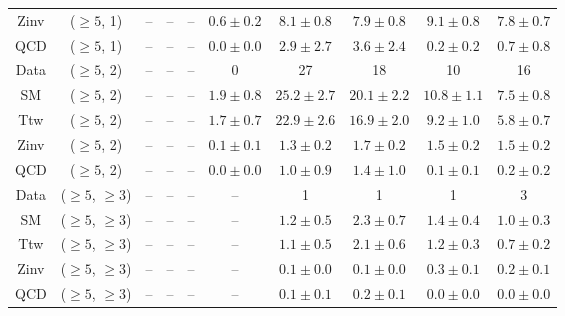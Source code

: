 \begin{table}[h!]
{\begin{tabular}{cccccccccc}
	Zinv & ($\ge5$, 1) & -- & -- & -- & $0.6\pm 0.2$ & $8.1\pm 0.8$ & $7.9\pm 0.8$ & $9.1\pm 0.8$ & $7.8\pm 0.7$ \\[0.5ex] 
	QCD & ($\ge5$, 1) & -- & -- & -- & $0.0\pm 0.0$ & $2.9\pm 2.7$ & $3.6\pm 2.4$ & $0.2\pm 0.2$ & $0.7\pm 0.8$ \\[0.5ex] 
	Data & ($\ge5$, 2) & -- & -- & -- & 0 & 27 & 18 & 10 & 16 \\[0.5ex] 
	SM & ($\ge5$, 2) & -- & -- & -- & $1.9\pm 0.8$ & $25.2\pm 2.7$ & $20.1\pm 2.2$ & $10.8\pm 1.1$ & $7.5\pm 0.8$ \\[0.5ex] 
	Ttw & ($\ge5$, 2) & -- & -- & -- & $1.7\pm 0.7$ & $22.9\pm 2.6$ & $16.9\pm 2.0$ & $9.2\pm 1.0$ & $5.8\pm 0.7$ \\[0.5ex] 
	Zinv & ($\ge5$, 2) & -- & -- & -- & $0.1\pm 0.1$ & $1.3\pm 0.2$ & $1.7\pm 0.2$ & $1.5\pm 0.2$ & $1.5\pm 0.2$ \\[0.5ex] 
	QCD & ($\ge5$, 2) & -- & -- & -- & $0.0\pm 0.0$ & $1.0\pm 0.9$ & $1.4\pm 1.0$ & $0.1\pm 0.1$ & $0.2\pm 0.2$ \\[0.5ex] 
	Data & ($\ge5$, $\ge3$) & -- & -- & -- & -- & 1 & 1 & 1 & 3 \\[0.5ex] 
	SM & ($\ge5$, $\ge3$) & -- & -- & -- & -- & $1.2\pm 0.5$ & $2.3\pm 0.7$ & $1.4\pm 0.4$ & $1.0\pm 0.3$ \\[0.5ex] 
	Ttw & ($\ge5$, $\ge3$) & -- & -- & -- & -- & $1.1\pm 0.5$ & $2.1\pm 0.6$ & $1.2\pm 0.3$ & $0.7\pm 0.2$ \\[0.5ex] 
	Zinv & ($\ge5$, $\ge3$) & -- & -- & -- & -- & $0.1\pm 0.0$ & $0.1\pm 0.0$ & $0.3\pm 0.1$ & $0.2\pm 0.1$ \\[0.5ex] 
	QCD & ($\ge5$, $\ge3$) & -- & -- & -- & -- & $0.1\pm 0.1$ & $0.2\pm 0.1$ & $0.0\pm 0.0$ & $0.0\pm 0.0$ \\[0.5ex] 
	\hline
	\hline
\end{tabular}}
\end{table}
